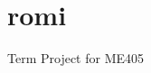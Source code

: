 \chapter{romi}
\hypertarget{md__r_e_a_d_m_e}{}\label{md__r_e_a_d_m_e}
\label{md__r_e_a_d_m_e_autotoc_md5}%
%


Term Project for ME405 